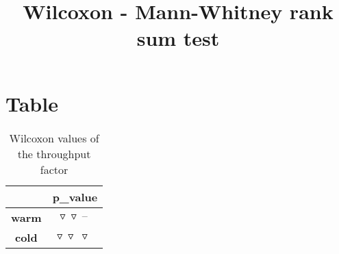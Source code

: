 \documentclass{article}
\title{Wilcoxon - Mann-Whitney rank sum test}
\author{}
\begin{document}
\maketitle
\section{Table}
\begin{table}[!htp]
  \caption{Wilcoxon values of the throughput factor}
  \label{table:throughput}
  \centering
  \begin{scriptsize}
  \begin{tabular}{c|c}
      & \textbf{p\_value} \\\hline
      \textbf{warm} & $\triangledown\ \triangledown\ \text{--}\ $ \\
      \textbf{cold} & $\triangledown\ \triangledown\ \triangledown\ $ \\
  \end{tabular}
  \end{scriptsize}
\end{table}
\end{document}

